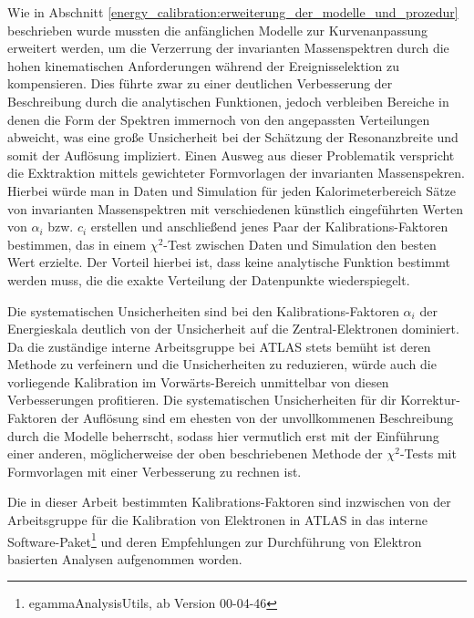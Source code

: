 Wie in Abschnitt \ref{energy_calibration:erweiterung_der_modelle_und_prozedur}
beschrieben wurde mussten die anfänglichen Modelle zur Kurvenanpassung
erweitert werden, um die Verzerrung der invarianten Massenspektren durch die
hohen kinematischen Anforderungen während der Ereignisselektion zu
kompensieren.  Dies führte zwar zu einer deutlichen Verbesserung der
Beschreibung durch die analytischen Funktionen, jedoch verbleiben Bereiche in
denen die Form der Spektren immernoch von den angepassten Verteilungen
abweicht, was eine große Unsicherheit bei der Schätzung der Resonanzbreite und
somit der Auflösung impliziert. Einen Ausweg aus dieser Problematik verspricht
die Exktraktion mittels gewichteter Formvorlagen der invarianten Massenspekren.
Hierbei würde man in Daten und Simulation für jeden Kalorimeterbereich Sätze
von invarianten Massenspektren mit verschiedenen künstlich eingeführten Werten
von $\alpha_i$ bzw. $c_i$ erstellen und anschließend jenes Paar der
Kalibrations-Faktoren bestimmen, das in einem $\chi^2$-Test zwischen Daten
und Simulation den besten Wert erzielte. Der Vorteil hierbei ist, dass keine
analytische Funktion bestimmt werden muss, die die exakte Verteilung der
Datenpunkte wiederspiegelt.

Die systematischen Unsicherheiten sind bei den Kalibrations-Faktoren $\alpha_i$
der Energieskala deutlich von der Unsicherheit auf die Zentral-Elektronen
dominiert. Da die zuständige interne Arbeitsgruppe bei ATLAS stets bemüht ist
deren Methode zu verfeinern und die Unsicherheiten zu reduzieren, würde
auch die vorliegende Kalibration im Vorwärts-Bereich unmittelbar von diesen
Verbesserungen profitieren. Die systematischen Unsicherheiten für dir
Korrektur-Faktoren der Auflösung sind em ehesten von der unvollkommenen
Beschreibung durch die Modelle beherrscht, sodass hier vermutlich erst mit der
Einführung einer anderen, möglicherweise der oben beschriebenen Methode der
$\chi^2$-Tests mit Formvorlagen mit einer Verbesserung zu rechnen ist.

Die in dieser Arbeit bestimmten Kalibrations-Faktoren sind inzwischen von der
Arbeitsgruppe für die Kalibration von Elektronen in ATLAS in das interne 
Software-Paket\footnote{egammaAnalysisUtils, ab Version 00-04-46} und deren
Empfehlungen zur Durchführung von Elektron basierten Analysen aufgenommen worden.

